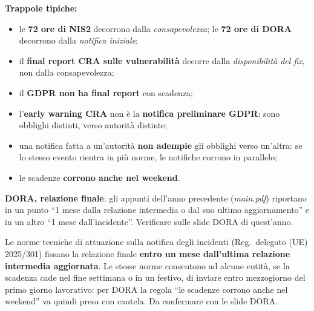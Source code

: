 \begin{esame}
\textbf{Trappole tipiche:}
\begin{itemize}
  \item le \textbf{72 ore di NIS2} decorrono dalla \emph{consapevolezza}; le \textbf{72 ore di DORA}
    decorrono dalla \emph{notifica iniziale};
  \item il \textbf{final report CRA sulle vulnerabilità} decorre dalla \emph{disponibilità del fix},
    non dalla consapevolezza;
  \item il \textbf{GDPR non ha final report} con scadenza;
  \item l'\textbf{early warning CRA} non è la \textbf{notifica preliminare GDPR}: sono obblighi
    distinti, verso autorità distinte;
  \item una notifica fatta a un'autorità \textbf{non adempie} gli obblighi verso un'altra: se lo stesso
    evento rientra in più norme, le notifiche corrono in parallelo;
  \item le scadenze \textbf{corrono anche nel weekend}.
\end{itemize}
\end{esame}

\begin{verifica}
\textbf{DORA, relazione finale}: gli appunti dell'anno precedente (\emph{main.pdf}) riportano in un
punto ``1 mese dalla relazione intermedia o dal suo ultimo aggiornamento'' e in un altro ``1 mese
dall'incidente''. Verificare sulle slide DORA di quest'anno.
\end{verifica}

\begin{integrazione}
Le norme tecniche di attuazione sulla notifica degli incidenti (Reg.~delegato (UE) 2025/301) fissano la
relazione finale \textbf{entro un mese dall'ultima relazione intermedia aggiornata}. Le stesse norme
consentono ad alcune entità, se la scadenza cade nel fine settimana o in un festivo, di inviare entro
mezzogiorno del primo giorno lavorativo: per DORA la regola ``le scadenze corrono anche nel weekend'' va
quindi presa con cautela. Da confermare con le slide DORA.
\end{integrazione}
